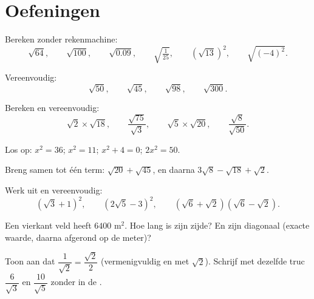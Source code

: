 \section{Oefeningen}

\begin{exercise}[$\star$]\label{exo:g9:sqrt:1}
Bereken zonder rekenmachine:
\[
\sqrt{64}, \qquad \sqrt{100}, \qquad \sqrt{0.09}, \qquad
\sqrt{\tfrac{1}{25}}, \qquad \left(\sqrt{13}\right)^2, \qquad
\sqrt{(-4)^2} .
\]
\end{exercise}

\begin{exercise}[$\star$]\label{exo:g9:sqrt:2}
Vereenvoudig:
\[
\sqrt{50}, \qquad \sqrt{45}, \qquad \sqrt{98}, \qquad \sqrt{300} .
\]
\end{exercise}

\begin{exercise}[$\star$]\label{exo:g9:sqrt:3}
Bereken en vereenvoudig:
\[
\sqrt2 \times \sqrt{18}, \qquad
\frac{\sqrt{75}}{\sqrt3}, \qquad
\sqrt5 \times \sqrt{20}, \qquad
\frac{\sqrt{8}}{\sqrt{50}} .
\]
\end{exercise}

\begin{exercise}[$\star$]\label{exo:g9:sqrt:4}
Los op: $x^2 = 36$; \quad $x^2 = 11$; \quad $x^2 + 4 = 0$; \quad
$2x^2 = 50$.
\end{exercise}

\begin{exercise}[$\star$]\label{exo:g9:sqrt:5}
Breng samen tot één term: $\sqrt{20} + \sqrt{45}$, en daarna
$3\sqrt8 - \sqrt{18} + \sqrt2$.
\end{exercise}

\begin{exercise}[$\star\star$]\label{exo:g9:sqrt:6}
Werk uit en vereenvoudig:
\[
\left(\sqrt3 + 1\right)^2, \qquad
\left(2\sqrt5 - 3\right)^2, \qquad
\left(\sqrt6 + \sqrt2\right)\left(\sqrt6 - \sqrt2\right).
\]
\end{exercise}

\begin{exercise}[$\star\star$]\label{exo:g9:sqrt:7}
Een vierkant veld heeft  $6400$ m$^2$. Hoe lang is zijn zijde? En zijn
diagonaal (exacte waarde, daarna afgerond op de meter)?
\end{exercise}

\begin{exercise}[$\star\star$]\label{exo:g9:sqrt:8}
Toon aan dat $\dfrac{1}{\sqrt2} = \dfrac{\sqrt2}{2}$ (vermenigvuldig  en
 met $\sqrt2$). Schrijf met dezelfde truc $\dfrac{6}{\sqrt3}$ en
$\dfrac{10}{\sqrt5}$ zonder  in de .
\end{exercise}

